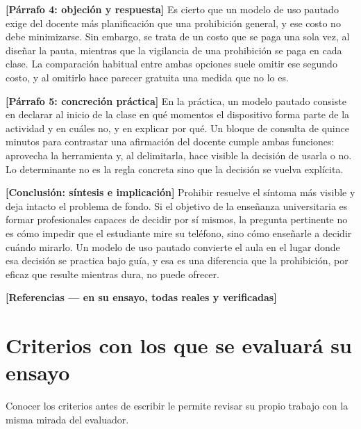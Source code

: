 \documentclass[12pt,a4paper,openany]{report}
\begin{document}
\textcolor{grismedio}{\small\textbf{[P\'arrafo 4: objeci\'on y respuesta]}} Es cierto que un modelo de uso pautado exige del docente m\'as planificaci\'on que una prohibici\'on general, y ese costo no debe minimizarse. Sin embargo, se trata de un costo que se paga una sola vez, al dise\~nar la pauta, mientras que la vigilancia de una prohibici\'on se paga en cada clase. La comparaci\'on habitual entre ambas opciones suele omitir ese segundo costo, y al omitirlo hace parecer gratuita una medida que no lo es.

\textcolor{grismedio}{\small\textbf{[P\'arrafo 5: concreci\'on pr\'actica]}} En la pr\'actica, un modelo pautado consiste en declarar al inicio de la clase en qu\'e momentos el dispositivo forma parte de la actividad y en cu\'ales no, y en explicar por qu\'e. Un bloque de consulta de quince minutos para contrastar una afirmaci\'on del docente cumple ambas funciones: aprovecha la herramienta y, al delimitarla, hace visible la decisi\'on de usarla o no. Lo determinante no es la regla concreta sino que la decisi\'on se vuelva expl\'icita.

\textcolor{grismedio}{\small\textbf{[Conclusi\'on: s\'intesis e implicaci\'on]}} Prohibir resuelve el s\'intoma m\'as visible y deja intacto el problema de fondo. Si el objetivo de la ense\~nanza universitaria es formar profesionales capaces de decidir por s\'i mismos, la pregunta pertinente no es c\'omo impedir que el estudiante mire su tel\'efono, sino c\'omo ense\~narle a decidir cu\'ando mirarlo. Un modelo de uso pautado convierte el aula en el lugar donde esa decisi\'on se practica bajo gu\'ia, y esa es una diferencia que la prohibici\'on, por eficaz que resulte mientras dura, no puede ofrecer.

\vspace{10pt}
\textcolor{grismedio}{\small\textbf{[Referencias --- en su ensayo, todas reales y verificadas]}}

\chapter{Criterios con los que se evaluar\'a su ensayo}
\label{anx:rubrica}

Conocer los criterios antes de escribir le permite revisar su propio trabajo con la misma mirada del evaluador.
\end{document}
